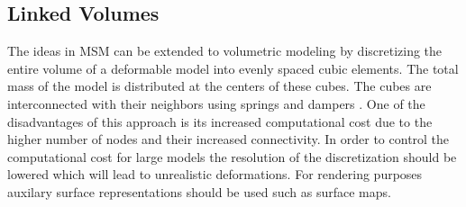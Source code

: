 \subsection{Linked Volumes}
The ideas in MSM can be extended to volumetric modeling by discretizing the entire volume of a deformable model into evenly spaced cubic elements.
The total mass of the model is distributed at the centers of these cubes. The cubes are interconnected with their neighbors using springs and dampers
\cite{gibson1997simulating}. One of the disadvantages of this approach is its increased computational cost due to the higher number of nodes and
their increased connectivity. In order to control the computational cost for large models the resolution of the discretization should be lowered 
which will lead to unrealistic deformations. For rendering purposes auxilary surface representations should be used such as surface maps. 






























